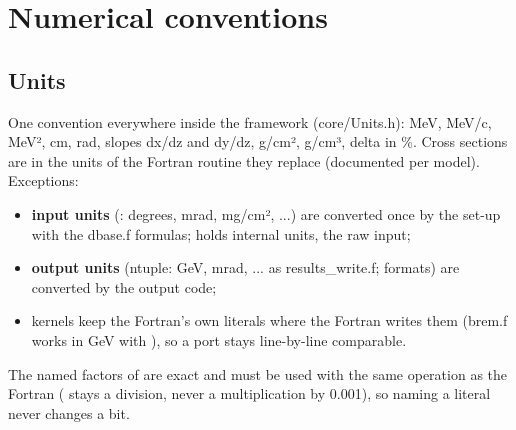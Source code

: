 \chapter{\texorpdfstring{Numerical conventions}{Numerical conventions}}\label{translation_report-04u5fnumerics}
\section{\texorpdfstring{Units}{Units}}\label{translation_report-04u5fnumerics:41-units}
One convention everywhere inside the framework (core/\allowbreak{}Units.\allowbreak{}h): MeV, MeV/c, MeV², cm, rad, slopes dx/dz and dy/dz,
g/cm², g/cm³, delta in \%. Cross sections are in the units of the Fortran routine they replace (documented per model).
Exceptions:

\begin{itemize}
\item \textbf{input units} (: degrees, mrad, mg/cm², ...) are converted once by the set-up with the dbase.f
formulas;  holds internal units,  the raw input;
\item \textbf{output units} (ntuple: GeV, mrad, ... as results\_\allowbreak{}write.\allowbreak{}f;  formats) are converted by the output code;
\item kernels keep the Fortran's own literals where the Fortran writes them (brem.f works in GeV with ), so a port
stays line-by-line comparable.
\end{itemize}
The named factors of  are exact and must be used with the same operation as the Fortran (
stays a division, never a multiplication by 0.001), so naming a literal never changes a bit.

